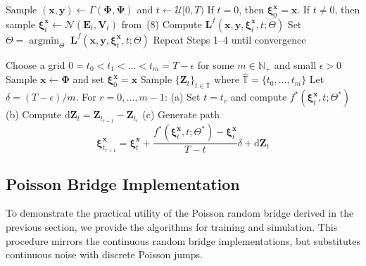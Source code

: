 \documentclass{article}
\def\N{\mathbb{N}}
\def\T{\mathbb{T}}
\def\dd{\mathrm{d}}
\def\xib{\boldsymbol{\xi}}
\DeclareMathOperator*{\argmin}{argmin}
\theoremstyle{definition}
\begin{document}
\begin{algorithm}[H]
\caption{Gaussian Bridge Training \cite{goria_random-bridges_2025}} \label{alg:gaussian_bridge_training}
\begin{algorithmic}[1]
\State Sample $(\boldsymbol{x}, \boldsymbol{y}) \leftarrow \Gamma(\boldsymbol{\Phi}, \boldsymbol{\Psi})$ and $t \leftarrow \mathcal{U}[0, T)$
\State If $t = 0$, then $\xib_0^{\boldsymbol{x}} = \boldsymbol{x}$. If $t \neq 0$, then sample $\xib_t^{\boldsymbol{x}} \leftarrow \mathcal{N}(\boldsymbol{E}_t, \boldsymbol{V}_t)$ from~(8)
\State Compute $\boldsymbol{L}^f(\boldsymbol{x}, \boldsymbol{y}, \xib_t^{\boldsymbol{x}}, t; \Theta)$
\State Set $\Theta = \argmin_\Theta \; \boldsymbol{L}^f(\boldsymbol{x}, \boldsymbol{y}, \xib_t^{\boldsymbol{x}}, t; \Theta)$
\State Repeat Steps 1--4 until convergence
\end{algorithmic}
\end{algorithm}

\begin{algorithm}[H]
\caption{Gaussian Bridge Simulation \cite{goria_random-bridges_2025}}
\begin{algorithmic}[1]
\State Choose a grid $0 = t_0 < t_1 < \dots < t_m = T - \epsilon$ for some $m \in \N_+$ and small $\epsilon > 0$
\State Sample $\boldsymbol{x} \leftarrow \boldsymbol{\Phi}$ and set $\xib_0^{\boldsymbol{x}} = \boldsymbol{x}$
\State Sample $\{\boldsymbol{Z}_t\}_{t \in \hat{\T}}$ where $\hat{\T} = \{t_0, \dots, t_m\}$
\State Let $\delta = (T - \epsilon)/m$. For $r = 0, \dots, m-1$:
\State \hspace{\algorithmicindent} (a) Set $t = t_r$ and compute $f^*(\xib_t^{\boldsymbol{x}}, t; \Theta^*)$
\State \hspace{\algorithmicindent} (b) Compute $\dd\boldsymbol{Z}_t = \boldsymbol{Z}_{t_{r+1}} - \boldsymbol{Z}_{t_r}$
\State \hspace{\algorithmicindent} (c) Generate path
\[
    \xib_{t_{r+1}}^{\boldsymbol{x}} = \xib_t^{\boldsymbol{x}} + \frac{f^*(\xib_t^{\boldsymbol{x}}, t; \Theta^*) - \xib_t^{\boldsymbol{x}}}{T - t}\delta + \dd\boldsymbol{Z}_t
\]
\end{algorithmic}
\end{algorithm}

\subsection{Poisson Bridge Implementation}\label{sec:num-poisson}

To demonstrate the practical utility of the Poisson random bridge derived in the previous section, we provide the algorithms for training and simulation. This procedure mirrors the continuous random bridge implementations, but substitutes continuous noise with discrete Poisson jumps.
\end{document}
